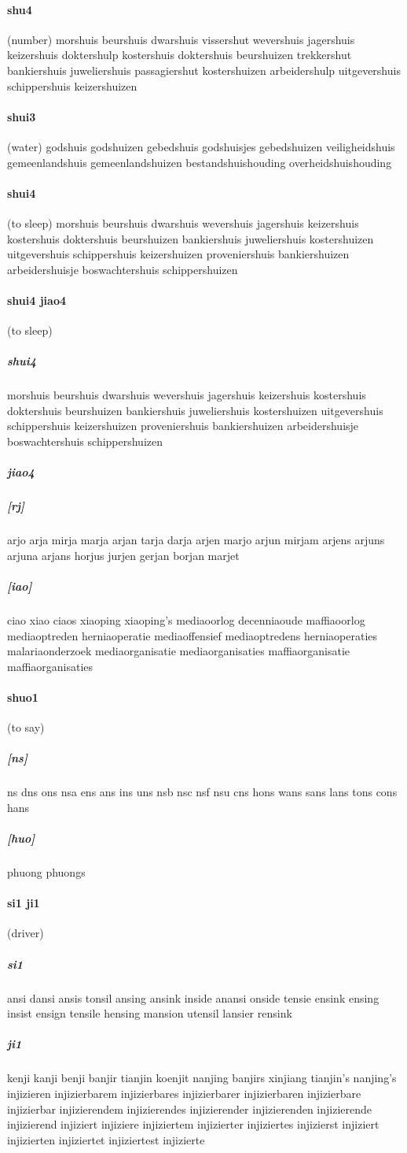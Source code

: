 \documentclass{article}
\begin{document}
\paragraph{shu4}(number) morshuis
beurshuis
dwarshuis
vissershut
wevershuis
jagershuis
keizershuis
doktershulp
kostershuis
doktershuis
beurshuizen
trekkershut
bankiershuis
juweliershuis
passagiershut
kostershuizen
arbeidershulp
uitgevershuis
schippershuis
keizershuizen
\paragraph{shui3}(water) godshuis
godshuizen
gebedshuis
godshuisjes
gebedshuizen
veiligheidshuis
gemeenlandshuis
gemeenlandshuizen
bestandshuishouding
overheidshuishouding
\paragraph{shui4}(to sleep) morshuis
beurshuis
dwarshuis
wevershuis
jagershuis
keizershuis
kostershuis
doktershuis
beurshuizen
bankiershuis
juweliershuis
kostershuizen
uitgevershuis
schippershuis
keizershuizen
proveniershuis
bankiershuizen
arbeidershuisje
boswachtershuis
schippershuizen
\paragraph{shui4 jiao4}(to sleep) \subparagraph{shui4}morshuis
beurshuis
dwarshuis
wevershuis
jagershuis
keizershuis
kostershuis
doktershuis
beurshuizen
bankiershuis
juweliershuis
kostershuizen
uitgevershuis
schippershuis
keizershuizen
proveniershuis
bankiershuizen
arbeidershuisje
boswachtershuis
schippershuizen
\subparagraph{jiao4}\subparagraph{[rj]}arjo
arja
mirja
marja
arjan
tarja
darja
arjen
marjo
arjun
mirjam
arjens
arjuns
arjuna
arjans
horjus
jurjen
gerjan
borjan
marjet
\subparagraph{[iao]}ciao
xiao
ciaos
xiaoping
xiaoping's
mediaoorlog
decenniaoude
maffiaoorlog
mediaoptreden
herniaoperatie
mediaoffensief
mediaoptredens
herniaoperaties
malariaonderzoek
mediaorganisatie
mediaorganisaties
maffiaorganisatie
maffiaorganisaties
\paragraph{shuo1}(to say) \subparagraph{[ns]}ns
dns
ons
nsa
ens
ans
ins
uns
nsb
nsc
nsf
nsu
cns
hons
wans
sans
lans
tons
cons
hans
\subparagraph{[huo]}phuong
phuongs
\paragraph{si1 ji1}(driver) \subparagraph{si1}ansi
dansi
ansis
tonsil
ansing
ansink
inside
anansi
onside
tensie
ensink
ensing
insist
ensign
tensile
hensing
mansion
utensil
lansier
rensink
\subparagraph{ji1}kenji
kanji
benji
banjir
tianjin
koenjit
nanjing
banjirs
xinjiang
tianjin's
nanjing's
injizieren injizierbarem injizierbares injizierbarer injizierbaren injizierbare injizierbar injizierendem injizierendes injizierender injizierenden injizierende injizierend injiziert injiziere injiziertem injizierter injiziertes injizierst injiziert injizierten injiziertet injiziertest injizierte
\end{document}
